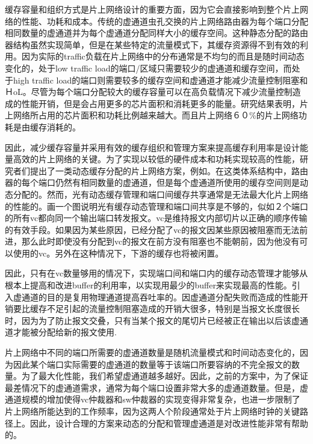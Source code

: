 ﻿\documentclass[10pt,journal]{IEEEtran}
\begin{document}
缓存容量和组织方式是片上网络设计的重要方面，因为它会直接影响到整个片上网络的性能、功耗和成本。传统的虚通道虫孔交换的片上网络路由器为每个端口分配相同数量的虚通道并为每个虚通道分配同样大小的缓存空间\cite{DaTo01}。这种静态分配的路由器结构虽然实现简单，但是在某些特定的流量模式下，其缓存资源得不到有效的利用。因为实际的traffic负载在片上网络中的分布通常是不均匀的而且是随时间动态变化的，处于low traffic load的端口/区域只需要较少的虚通道和缓存空间，而处于high traffic load的端口则需要较多的缓存空间和虚通道才能减少流量控制阻塞和ＨoL。尽管为每个端口分配较大的缓存容量可以在高负载情况下减少流量控制造成的性能开销，但是会占用更多的芯片面积和消耗更多的能量。研究结果表明，片上网络所占用的芯片面积和功耗比例越来越大\cite{1650108}。而且片上网络６０\%的片上网络功耗是由缓存消耗的\cite{ChPe03}。

因此，减少缓存容量并采用有效的缓存组织和管理方案来提高缓存利用率是设计能量高效的片上网络的关键。为了实现以较低的硬件成本和功耗实现较高的性能，研究者们提出了一类动态缓存分配的片上网络方案，例如\cite{NPKV06}\cite{4555894}\cite{5770788}\cite{Neishaburi:2009:RAN:1531542.1531658}\cite{6310960}。在这类体系结构中，路由器的每个端口仍然有相同数量的虚通道，但是每个虚通道所使用的缓存空间则是动态分配的。然而，光有动态缓存管理和端口间缓存共享通常是无法最大化片上网络的性能的。画一个图说明光有缓存动态管理和端口间共享是不够的，似如２个端口的所有vc都向同一个输出端口转发报文。vc是维持报文内部切片以正确的顺序传输的有效手段。如果因为某些原因，已经分配了vc的报文因某些原因被阻塞而无法前进，那么此时即使没有分配到vc的报文在前方没有阻塞也不能朝前，因为他没有可以使用的vc。另外在这种情况下，下游的缓存也将被闲置。

因此，只有在vc数量够用的情况下，实现端口间和端口内的缓存动态管理才能够从根本上提高和改进buffer的利用率，以实现用最少的buffer来实现最高的性能。引入虚通道的目的是复用物理通道提高吞吐率的。因虚通道分配失败而造成的性能开销要比缓存不足引起的流量控制阻塞造成的开销大很多，特别是当报文长度很长时，因为为了防止报文交叠，只有当某个报文的尾切片已经被正在输出以后该虚通道才能被分配给新的报文使用.　

片上网络中不同的端口所需要的虚通道数量是随机流量模式和时间动态变化的，因为因此某个端口实际需要的虚通道的数量等于该端口所要容纳的不完全报文的数量。为了最大化性能，我们希望虚通道越多越好。因此，之前的方案中\cite{NPKV06}\cite{4555894}\cite{5770788}\cite{Neishaburi:2009:RAN:1531542.1531658}\cite{6310960}，为了保证最差情况下的虚通道需求，通常为每个端口设置非常大多的虚通道数量。但是，虚通道规模的增加使得vc仲裁器和sw仲裁器的实现变得非常复杂，也进一步限制了片上网络所能达到的工作频率，因为这两人个阶段通常处于片上网络时钟的关键路径上。因此，设计合理的方案来动态的分配和管理虚通道是对改进性能非常有帮助的。
\end{document}
